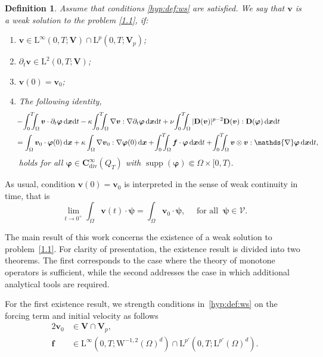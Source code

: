 \documentclass[12pt,reqno]{amsart}
\numberwithin{equation}{section}
\newtheorem{definition}[theorem]{Definition}
\theoremstyle{definition}
\def\1{\Omega}
\def\dx{\,\mathrm{d}\boldsymbol{x}}
\def\dxt{\,\mathrm{d}\boldsymbol{x}\mathrm{d}t}
\def\div{\operatorname{div}}
\def\supp{\operatorname{supp}}
\def\W{\mathrm{W}}
\def\L{\mathrm{L}}
\def\vv{\boldsymbol{v}}
\def\f{\boldsymbol{f}}
\def\bfC{\mathbf{C}}
\def\bfV{\mathbf{V}}
\def\bfD{\mathbf{D}}
\def\bfi{\boldsymbol{\varphi}}
\def\bpsi{\boldsymbol{\psi}}
\def\bVcal{\boldsymbol{\mathcal{V}}}
\begin{document}
\begin{definition}\label{def.1}
{Assume that conditions \eqref{hyp:def:ws} are satisfied.}
We say that $\vv$ is a weak solution to the problem \eqref{1.1}, if:
\begin{enumerate}
  \item $\vv\in\L^\infty(0,T;\bfV)\cap\L^p(0,T;\bfV_p)$;
  \item ${\partial_t\vv}\in\L^2(0,T;\bfV)$;
  \item {$\vv(0)=\vv_0$;}
  \item The following identity,
\begin{equation}\label{3p3}
\begin{split}
& \hspace{-0.2cm}
-\!\int_{0}^{T}\!\!\!\!\int_{\Omega}\vv\cdot\partial_t\bfi \dxt - \kappa\!\int_{0}^{T}\!\!\!\!\int_{\Omega}\nabla\vv:\nabla\partial_t\bfi\dxt +
\nu\!\int_{0}^{T}\!\!\!\!\int_{\Omega}|\bfD(\vv)|^{p-2}\bfD(\vv):\bfD(\bfi)\dxt  \\
& \hspace{-0.2cm} =
\int_\1\vv_0\cdot\bfi(0)\dx + \kappa\int_\1\nabla\vv_0:\nabla\bfi(0)\dx + \!\int_{0}^{T}\!\!\!\!\int_{\Omega}\f\cdot\bfi\dxt + \!\int_{0}^{T}\!\!\!\!\int_{\Omega} \vv\otimes\vv:\mathds{\nabla}\bfi\dxt,
\end{split}
\end{equation}
holds for all $\bfi\in \bfC^\infty_{\div}(Q_T)$ with $\supp(\bfi) \Subset \Omega\times [0,T)$.
\end{enumerate}
\end{definition}


As usual, condition $\vv(0) = \vv_0$ is interpreted in the sense of weak continuity in time, that is
\begin{equation*}
  \lim_{t \to 0^+} \int_{\Omega} \vv(t) \cdot \bpsi = \int_{\Omega} \vv_0 \cdot \bpsi, \quad \text{ for all }\ \bpsi \in \bVcal.
\end{equation*}


The main result of this work concerns the existence of a weak solution to problem~\eqref{1.1}.
For clarity of presentation, the existence result is divided into two theorems. The first corresponds to the case where the theory of monotone operators is sufficient, while the second addresses the case in which additional analytical tools are required.

For the first existence result, we strength conditions in~\eqref{hyp:def:ws} on the forcing term and initial velocity as follows
\begin{alignat}{2}
\label{Hyp:u0}
  \vv_0&\in\bfV\cap\bfV_p,  \\
\label{Hyp:f:1}
  \f&\in\L^{\infty}(0,T;\W^{-1,2}(\1)^d)\cap\L^{p'}(0,T;\L^{p'}(\1)^d).
\end{alignat}
\end{document}
